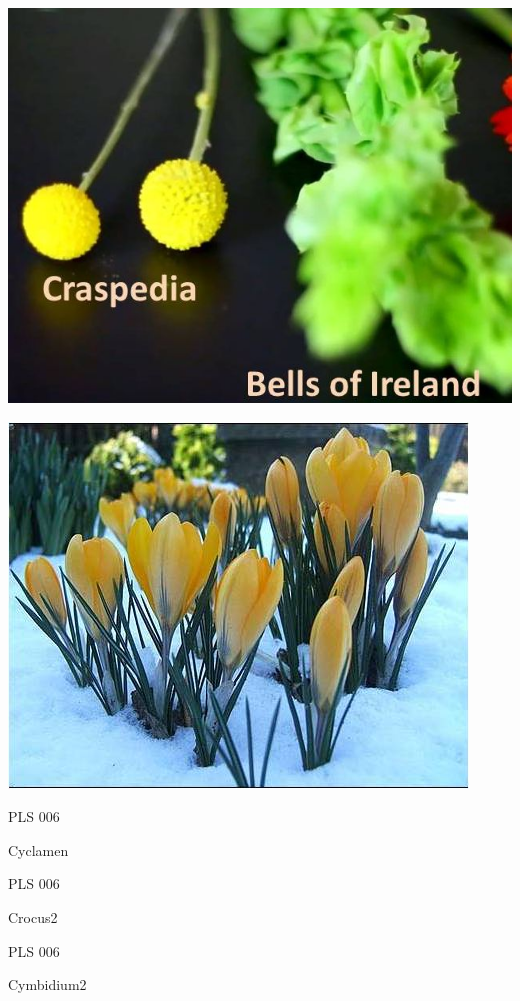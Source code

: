 \documentclass{article}
\begin{document}
\begin{center}
\includegraphics[height=0.925\paperheight]{../Craspedia-BellsOfIreland.jpg}
\end{center}
\newpage

\begin{center}
\includegraphics[height=0.925\paperheight]{../Crocus.jpg}
\end{center}
\newpage

\noindent  PLS 006
\vfill
\centerline{{\huge Cyclamen }}
\vfill
\newpage

\noindent  PLS 006
\vfill
\centerline{{\huge Crocus2 }}
\vfill
\newpage

\noindent  PLS 006
\vfill
\centerline{{\huge Cymbidium2 }}
\vfill
\newpage
\end{document}
